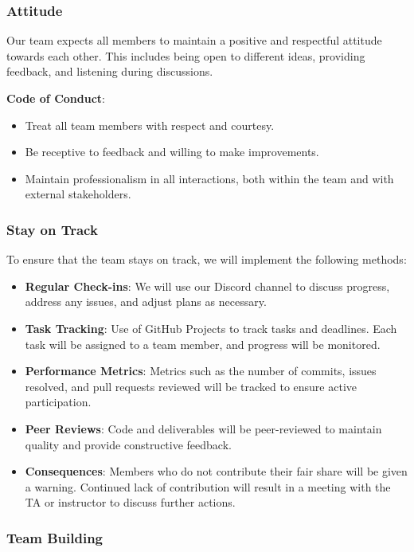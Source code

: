 \documentclass{article}
\begin{document}
\subsubsection*{Attitude}

Our team expects all members to maintain a positive and respectful attitude towards each other. 
This includes being open to different ideas, providing feedback, and  
listening during discussions.

\textbf{Code of Conduct}:
\begin{itemize}
    \item Treat all team members with respect and courtesy.
    \item Be receptive to feedback and willing to make improvements.
    \item Maintain professionalism in all interactions, both within the team and with external stakeholders.
\end{itemize}

\subsubsection*{Stay on Track}

To ensure that the team stays on track, we will implement the following methods:

\begin{itemize}
    \item \textbf{Regular Check-ins}: We will use our Discord channel to discuss progress, address any issues, and adjust plans as necessary.
    \item \textbf{Task Tracking}: Use of GitHub Projects to track tasks and deadlines. Each task will be assigned to a team member, and progress will be monitored.
    \item \textbf{Performance Metrics}: Metrics such as the number of commits, issues resolved, and pull requests reviewed will be tracked to ensure active participation.
    \item \textbf{Peer Reviews}: Code and deliverables will be peer-reviewed to maintain quality and provide constructive feedback.
    \item \textbf{Consequences}: Members who do not contribute their fair share will be given a warning. Continued lack of contribution will result in a meeting with the TA or instructor to discuss further actions.
\end{itemize}

\subsubsection*{Team Building}
\end{document}
